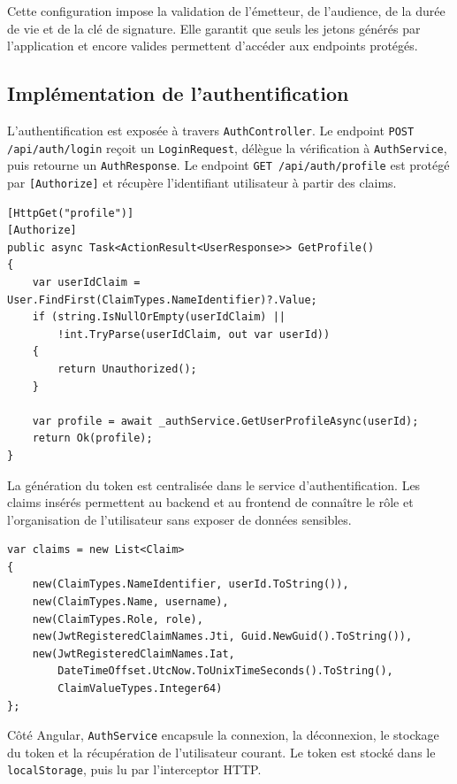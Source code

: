 \documentclass[12pt,a4paper]{report}
\begin{document}
Cette configuration impose la validation de l'émetteur, de l'audience, de la durée de vie et de la clé de signature. Elle garantit que seuls les jetons générés par l'application et encore valides permettent d'accéder aux endpoints protégés.

\subsection{Implémentation de l'authentification}

L'authentification est exposée à travers \texttt{AuthController}. Le endpoint \texttt{POST /api/auth/login} reçoit un \texttt{LoginRequest}, délègue la vérification à \texttt{AuthService}, puis retourne un \texttt{AuthResponse}. Le endpoint \texttt{GET /api/auth/profile} est protégé par \texttt{[Authorize]} et récupère l'identifiant utilisateur à partir des claims.

\begin{lstlisting}[caption={Endpoint de récupération du profil utilisateur}]
[HttpGet("profile")]
[Authorize]
public async Task<ActionResult<UserResponse>> GetProfile()
{
    var userIdClaim = User.FindFirst(ClaimTypes.NameIdentifier)?.Value;
    if (string.IsNullOrEmpty(userIdClaim) ||
        !int.TryParse(userIdClaim, out var userId))
    {
        return Unauthorized();
    }

    var profile = await _authService.GetUserProfileAsync(userId);
    return Ok(profile);
}
\end{lstlisting}

La génération du token est centralisée dans le service d'authentification. Les claims insérés permettent au backend et au frontend de connaître le rôle et l'organisation de l'utilisateur sans exposer de données sensibles.

\begin{lstlisting}[caption={Claims principaux intégrés au jeton JWT}]
var claims = new List<Claim>
{
    new(ClaimTypes.NameIdentifier, userId.ToString()),
    new(ClaimTypes.Name, username),
    new(ClaimTypes.Role, role),
    new(JwtRegisteredClaimNames.Jti, Guid.NewGuid().ToString()),
    new(JwtRegisteredClaimNames.Iat,
        DateTimeOffset.UtcNow.ToUnixTimeSeconds().ToString(),
        ClaimValueTypes.Integer64)
};
\end{lstlisting}

Côté Angular, \texttt{AuthService} encapsule la connexion, la déconnexion, le stockage du token et la récupération de l'utilisateur courant. Le token est stocké dans le \texttt{localStorage}, puis lu par l'interceptor HTTP.
\end{document}
